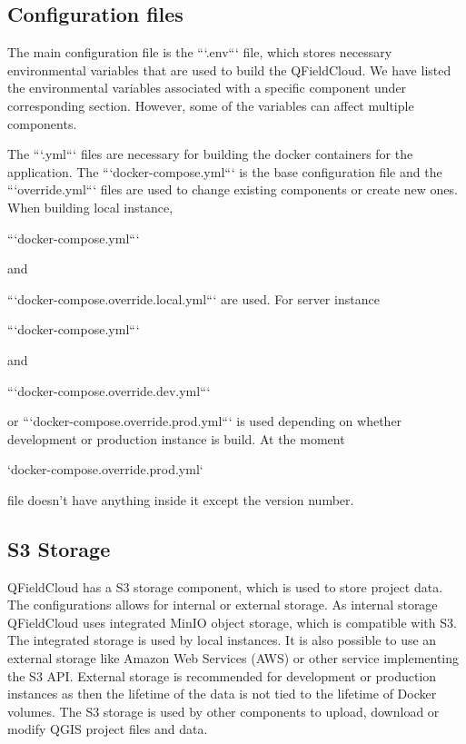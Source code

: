 \documentclass{article}
\begin{document}
\subsection{Configuration files}

\begin{markdown}
The main configuration file is the ```.env``` file, which stores necessary environmental variables that are used to build the QFieldCloud. We have listed the environmental variables associated with a specific component under corresponding section. However, some of the variables can affect multiple components.

The ```.yml``` files are necessary for building the docker containers for the application. The ```docker-compose.yml``` is the base configuration file and the ```override.yml``` files are used to change existing components or create new ones. When building local instance, 

```docker-compose.yml```

and 

```docker-compose.override.local.yml``` are used. For server instance 

```docker-compose.yml``` 

and 

```docker-compose.override.dev.yml```

or  
```docker-compose.override.prod.yml``` is used depending on whether development or production instance is build. At the moment

`docker-compose.override.prod.yml` 

file doesn't have anything inside it except the version number.
\end{markdown}

\subsection{S3 Storage}
\begin{markdown}
QFieldCloud has a S3 storage component, which is used to store project data. The configurations allows for internal or external storage. As internal storage QFieldCloud uses integrated MinIO object storage, which is compatible with S3. The integrated storage is used by local instances. It is also possible to use an external storage like Amazon Web Services (AWS) or other service implementing the S3 API. External storage is recommended for development or production instances as then the lifetime of the data is not tied to the lifetime of Docker volumes. The S3 storage is used by other components to upload, download or modify QGIS project files and data.
\end{markdown}
\end{document}
